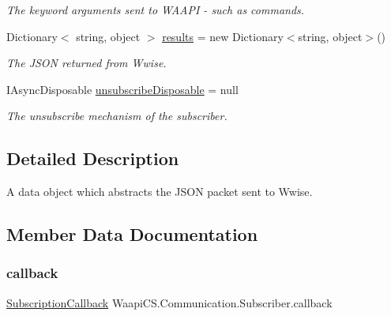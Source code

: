 \begin{DoxyCompactItemize}
\begin{DoxyCompactList}\small\item\em The keyword arguments sent to W\+A\+A\+PI -\/ such as commands. \end{DoxyCompactList}\item 
Dictionary$<$ string, object $>$ \mbox{\hyperlink{class_waapi_c_s_1_1_communication_1_1_subscriber_abf320768fcdb6a60c222f6fc4c3b93ba}{results}} = new Dictionary$<$string, object$>$()
\begin{DoxyCompactList}\small\item\em The J\+S\+ON returned from Wwise. \end{DoxyCompactList}\item 
I\+Async\+Disposable \mbox{\hyperlink{class_waapi_c_s_1_1_communication_1_1_subscriber_abcaebc9074477ea078a0a095042122eb}{unsubscribe\+Disposable}} = null
\begin{DoxyCompactList}\small\item\em The unsubscribe mechanism of the subscriber. \end{DoxyCompactList}\end{DoxyCompactItemize}


\subsection{Detailed Description}
A data object which abstracts the J\+S\+ON packet sent to Wwise. 



\subsection{Member Data Documentation}
\mbox{\label{class_waapi_c_s_1_1_communication_1_1_subscriber_acc9bb656a9ea5510401dbe5b357e1d25}} 
\subsubsection{\texorpdfstring{callback}{callback}}
{\footnotesize\ttfamily \mbox{\hyperlink{class_waapi_c_s_1_1_communication_1_1_subscription_callback}{Subscription\+Callback}} Waapi\+C\+S.\+Communication.\+Subscriber.\+callback}



